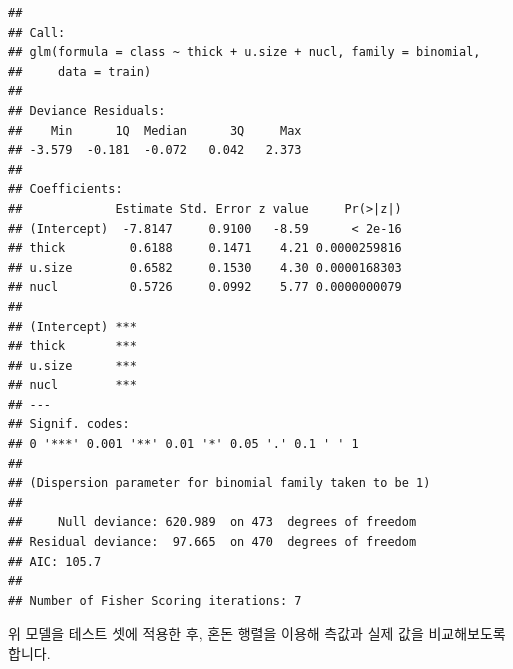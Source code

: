 \documentclass[12pt,]{book}
\newenvironment{Shaded}{\begin{snugshade}}{\end{snugshade}}
\newcommand{\DataTypeTok}[1]{\textcolor[rgb]{0.13,0.29,0.53}{#1}}
\newcommand{\DecValTok}[1]{\textcolor[rgb]{0.00,0.00,0.81}{#1}}
\newcommand{\FloatTok}[1]{\textcolor[rgb]{0.00,0.00,0.81}{#1}}
\newcommand{\KeywordTok}[1]{\textcolor[rgb]{0.13,0.29,0.53}{\textbf{#1}}}
\newcommand{\NormalTok}[1]{#1}
\newcommand{\OperatorTok}[1]{\textcolor[rgb]{0.81,0.36,0.00}{\textbf{#1}}}
\newcommand{\StringTok}[1]{\textcolor[rgb]{0.31,0.60,0.02}{#1}}
\begin{document}
\begin{verbatim}
## 
## Call:
## glm(formula = class ~ thick + u.size + nucl, family = binomial, 
##     data = train)
## 
## Deviance Residuals: 
##    Min      1Q  Median      3Q     Max  
## -3.579  -0.181  -0.072   0.042   2.373  
## 
## Coefficients:
##             Estimate Std. Error z value     Pr(>|z|)
## (Intercept)  -7.8147     0.9100   -8.59      < 2e-16
## thick         0.6188     0.1471    4.21 0.0000259816
## u.size        0.6582     0.1530    4.30 0.0000168303
## nucl          0.5726     0.0992    5.77 0.0000000079
##                
## (Intercept) ***
## thick       ***
## u.size      ***
## nucl        ***
## ---
## Signif. codes:  
## 0 '***' 0.001 '**' 0.01 '*' 0.05 '.' 0.1 ' ' 1
## 
## (Dispersion parameter for binomial family taken to be 1)
## 
##     Null deviance: 620.989  on 473  degrees of freedom
## Residual deviance:  97.665  on 470  degrees of freedom
## AIC: 105.7
## 
## Number of Fisher Scoring iterations: 7
\end{verbatim}

위 모델을 테스트 셋에 적용한 후, 혼돈 행렬을 이용해 측값과 실제 값을 비교해보도록 합니다.

\begin{Shaded}
\end{Shaded}
\end{document}
